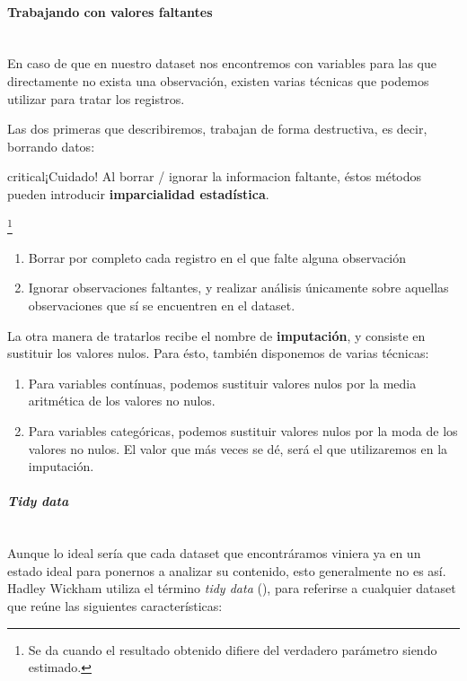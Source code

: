 \paragraph{Trabajando con valores faltantes} \mbox{}\\

En caso de que en nuestro dataset nos encontremos con variables para las que
directamente no exista una observación, existen varias técnicas que podemos
utilizar para tratar los registros.

Las dos primeras que describiremos, trabajan de forma destructiva, es decir,
borrando datos: 

\begin{TMbulletin}{critical}{$¡$Cuidado!}
  Al borrar / ignorar la informacion faltante, éstos métodos pueden
  introducir \textbf{imparcialidad estadística}.
\end{TMbulletin}
\footnote{Se da cuando
el resultado obtenido difiere del verdadero parámetro siendo estimado.}

\begin{enumerate}
\item Borrar por completo cada registro en el que falte alguna observación
\item Ignorar observaciones faltantes, y realizar análisis únicamente sobre
  aquellas observaciones que sí se encuentren en el dataset.
\end{enumerate}

La otra manera de tratarlos recibe el nombre de \textbf{imputación}, y consiste
en sustituir los valores nulos. Para ésto, también disponemos de varias técnicas:

\begin{enumerate}
\item Para variables contínuas, podemos sustituir valores nulos por la media
  aritmética de los valores no nulos.
\item Para variables categóricas, podemos sustituir valores nulos por la moda de
  los valores no nulos. El valor que más veces se dé, será el que utilizaremos
  en la imputación.
\end{enumerate}


\paragraph{\emph{Tidy data}}\mbox{}\\

Aunque lo ideal sería que cada dataset que encontráramos viniera ya en un
estado ideal para ponernos a analizar su contenido, esto generalmente no es así.
Hadley Wickham utiliza el término \emph{tidy data} (\cite{tidy-data}), para
referirse a cualquier dataset que reúne las siguientes características:

